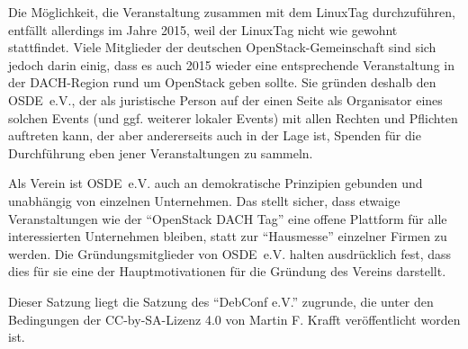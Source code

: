 \documentclass[draft]{scrartcl}
\newcommand{\VereinsName}{OSDE}
\begin{document}
Die Möglichkeit, die Veranstaltung zusammen mit dem LinuxTag durchzuführen,
entfällt allerdings im Jahre 2015, weil der LinuxTag nicht wie gewohnt
stattfindet. Viele Mitglieder der deutschen OpenStack-Gemeinschaft sind
sich jedoch darin einig, dass es auch 2015 wieder eine entsprechende
Veranstaltung in der DACH-Region rund um OpenStack geben sollte. Sie
gründen deshalb den \VereinsName\ e.V., der als juristische Person auf der
einen Seite als Organisator eines solchen Events (und ggf. weiterer
lokaler Events) mit allen Rechten und Pflichten auftreten kann, der aber
andererseits auch in der Lage ist, Spenden für die Durchführung eben jener
Veranstaltungen zu sammeln.

Als Verein ist \VereinsName\ e.V. auch an demokratische Prinzipien gebunden
und unabhängig von einzelnen Unternehmen. Das stellt sicher, dass etwaige
Veranstaltungen wie der "`OpenStack DACH Tag"' eine offene Plattform für alle
interessierten Unternehmen bleiben, statt zur "`Hausmesse"' einzelner Firmen
zu werden. Die Gründungsmitglieder von \VereinsName\ e.V. halten ausdrücklich
fest, dass dies für sie eine der Hauptmotivationen für die Gründung des
Vereins darstellt.

Dieser Satzung liegt die Satzung des "`DebConf e.V."' zugrunde, die unter
den Bedingungen der CC-by-SA-Lizenz 4.0 von Martin F. Krafft veröffentlicht
worden ist.

\normalsize
\end{document}
